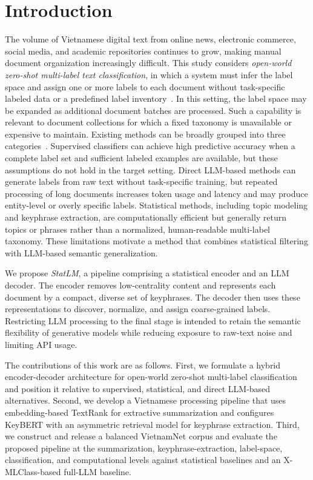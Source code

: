 \section{Introduction}
The volume of Vietnamese digital text from online news, electronic commerce,
social media, and academic repositories continues to grow, making manual document
organization increasingly difficult. This study considers \emph{open-world
zero-shot multi-label text classification}, in which a system must infer the label
space and assign one or more labels to each document without task-specific labeled
data or a predefined label inventory~\cite{li2024open}. In this setting, the label
space may be expanded as additional document batches are processed. Such a capability is relevant to document collections for which a fixed taxonomy is unavailable or expensive to maintain.
Existing methods can be broadly grouped into three categories~\cite{li2024open}.
Supervised classifiers can achieve high predictive accuracy when a complete label
set and sufficient labeled examples are available, but these assumptions do not
hold in the target setting. Direct LLM-based methods can generate labels from raw
text without task-specific training, but repeated processing of long documents
increases token usage and latency and may produce entity-level or overly specific
labels. Statistical methods, including topic modeling and keyphrase extraction,
are computationally efficient but generally return topics or phrases rather than a
normalized, human-readable multi-label taxonomy. These limitations motivate a
method that combines statistical filtering with LLM-based semantic generalization.

We propose \emph{StatLM}, a pipeline comprising a statistical encoder and an LLM
decoder. The encoder removes low-centrality content and represents each document by
a compact, diverse set of keyphrases. The decoder then uses these representations
to discover, normalize, and assign coarse-grained labels. Restricting LLM processing to the final stage is intended to retain the semantic flexibility of generative models while reducing exposure to raw-text noise and limiting API usage.

The contributions of this work are as follows. First, we formulate a
hybrid encoder-decoder architecture for open-world zero-shot multi-label
classification and position it relative to supervised, statistical, and direct
LLM-based alternatives. Second, we develop a Vietnamese processing pipeline that
uses embedding-based TextRank for extractive summarization and configures KeyBERT
with an asymmetric retrieval model for keyphrase extraction. Third, we construct
and release a balanced VietnamNet corpus and evaluate the proposed pipeline at the
summarization, keyphrase-extraction, label-space, classification, and computational
levels against statistical baselines and an X-MLClass-based full-LLM baseline.

